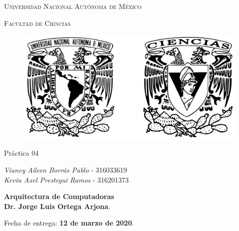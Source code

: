 \documentclass[11pt,letterpaper]{article}
\begin{document}
	
	\begin{titlepage}
		\centering
		
		{\scshape\LARGE Universidad Nacional Autónoma de México \par}
		
		\vspace{1cm}
		{\scshape\Large Facultad de Ciencias\par}
		\vspace{1.5cm}
		
		\begin{figure}[h]
			\centering
			\includegraphics[scale=0.15]{logo.png}
		\end{figure}
		
		\vspace{.8 cm}
		
		{\LARGE Práctica 04 \par}
		
		\vspace{0.5cm}
		\large{\itshape{Vianey Aileen Borrás Pablo}} \small{ - 316033619} \\ \vspace{0.3cm}
		\large{\itshape{Kevin Axel Prestegui Ramos}} \small{ - 316201373} \\ \vspace{0.3cm}
		\vfill
		
		\textbf{Arquitectura de Computadoras}\\
		\textbf{Dr. Jorge Luis Ortega Arjona}. \par
		\vspace{0.5cm}
		Fecha de entrega: \textbf{12 de marzo de 2020}.
	\end{titlepage}
\end{document}

